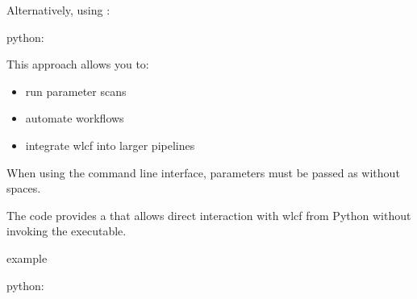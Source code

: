\documentclass[letterpaper,10pt,english]{sphinxmanual}
\begin{document}
\sphinxAtStartPar
Alternatively, using  :

\sphinxAtStartPar
python:

\begin{sphinxVerbatim}[commandchars=\\\{\}]

\PYG{p}{[}
    \PYG{p}{]}
\end{sphinxVerbatim}

\sphinxAtStartPar
This approach allows you to:
\begin{itemize}
\item {} 
\sphinxAtStartPar
run parameter scans

\item {} 
\sphinxAtStartPar
automate workflows

\item {} 
\sphinxAtStartPar
integrate wlcf into larger pipelines

\end{itemize}

\sphinxAtStartPar
When using the command line interface, parameters must be passed as  without spaces.

\sphinxAtStartPar
{}

\sphinxAtStartPar
The code provides a  that allows direct interaction with wlcf from Python without invoking the executable.

\sphinxAtStartPar
example

\sphinxAtStartPar
python:

\begin{sphinxVerbatim}[commandchars=\\\{\}]
 

  


\end{sphinxVerbatim}
\end{document}
